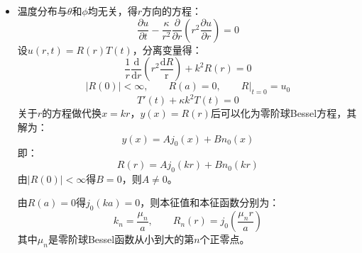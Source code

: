 \documentclass[fontset=windows]{ctexart}
\begin{document}
\begin{itemize}
    取$\omega \to \omega_0$的极限，由L'Hospital法则得此时$u(r,t)$的解为：
    \begin{align*}
    u(r,t)
    &= -\frac{AR}{c\mu_i^2 \mathrm{J}_1(\mu_i)}\mathrm{J}_0\left(\frac{\mu_i r}{R}\right)\left[t\cos\left(\frac{\mu_i c}{R}t\right) - \frac{R}{\mu_i c}\sin\left(\frac{\mu_i c}{R}t\right)\right] \\
    &\quad + \sum_{i=1,\: i \neq j}^{\infty}\frac{2AR^2}{\mu_i^2 \left(\mu_i^2 - \mu_j^2\right)\mathrm{J}_1(\mu_i)}\left[\mu_i\sin\left(\frac{\mu_i c}{R}t\right) - \mu_j\sin\left(\frac{\mu_j c}{R}t\right)\right]\mathrm{J}_0\left(\frac{\mu_i r}{R}\right)
    \end{align*}
    \bigskip

    \item[11.]
    温度分布与$\theta$和$\phi$均无关，得$r$方向的方程：
    \[
    \frac{\partial u}{\partial t} - \frac{\kappa}{r^2}\frac{\partial}{\partial r}\left(r^2 \frac{\partial u}{\partial r}\right) = 0
    \]
    设$u(r,t) = R(r)T(t)$，分离变量得：
    \[
    \frac{1}{r}\frac{\mathrm{d}}{\mathrm{d}r}\left(r^2\frac{\mathrm{d}R}{\mathrm{r}}\right) + k^2R(r) = 0
    \]
    \[
    \left|R(0)\right| < \infty,\qquad R(a) = 0,\qquad \left.R\right|_{t=0} = u_0
    \]
    \[
    T'(t) + \kappa k^2 T(t) = 0
    \]
    关于$r$的方程做代换$x = kr$，$y(x) = R(r)$后可以化为零阶球Bessel方程，其解为：
    \[
    y(x) = Aj_0(x) + Bn_0(x)
    \]
    即：
    \[
    R(r) = Aj_0(kr) + Bn_0(kr)
    \]
    由$\left|R(0)\right| < \infty$得$B = 0$，则$A \neq 0$。

    由$R(a) = 0$得$j_0(ka) = 0$，则本征值和本征函数分别为：
    \[
    k_n = \frac{\mu_n}{a},\qquad R_n(r) = j_0\left(\frac{\mu_n r}{a}\right)
    \]
    其中$\mu_n$是零阶球Bessel函数从小到大的第$n$个正零点。


\end{itemize}
\end{document}

